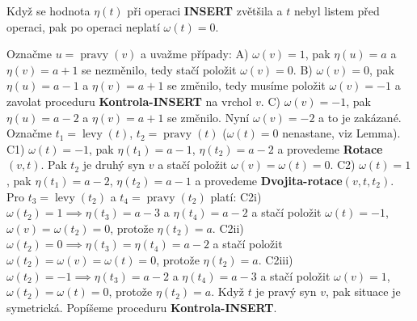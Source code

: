 \documentclass[a4paper,12pt]{article}
\DeclareMathOperator*{\levy}{levy}
\DeclareMathOperator*{\pravy}{pravy}
\begin{document}
Když se hodnota $\eta (t)$ při operaci {\bf INSERT }
zvětšila a $t$ nebyl listem před operaci, pak po operaci 
neplatí $\omega (t)=0$.
\endproclaim

Označme $u=\pravy(v)$ a uvažme případy:\newline 
A) $\omega (v)=1$, pak $\eta (u)=a$ a $\eta (v)=a+1$ se nezměnilo, 
tedy stačí položit $\omega (v)=0$.\newline 
B) $\omega (v)=0$, pak $\eta (u)=a-1$ a $\eta (v)=a+1$ se změnilo, 
tedy musíme položit $\omega (v)=-1$ a zavolat proceduru 
{\bf Kontrola-INSERT} na vrchol $v$.\newline 
C) $\omega (v)=-1$, pak $\eta (u)=a-2$ a $\eta (v)=a+1$ se změnilo. 
Nyní $\omega (v)=-2$ a to je zakázané. Označme $t_1=\levy
(t)$, 
$t_2=\pravy(t)$ ($\omega (t)=0$ nenastane, viz Lemma). 
\newline 
C1) $\omega (t)=-1$, pak $\eta (t_1)=a-1$, $\eta (t_2)=a-2$ a provedeme 
{\bf Rotace$(v,t)$}. Pak $t_2$ je druhý syn $v$ a stačí položit 
$\omega (v)=\omega (t)=0$.\newline 
C2) $\omega (t)=1$, pak $\eta (t_1)=a-2$, $\eta (t_2)=a-1$ a provedeme 
{\bf Dvojita-rotace$(v,t,t_2)$}. Pro $t_3=\levy(t_2)$ a $t_4=\pravy
(t_2)$ 
platí:\newline 
C2i) $\omega (t_2)=1\implies\eta (t_3)=a-3$ a $\eta (t_4)=a-2$ a stačí 
položit $\omega (t)=-1$, $\omega (v)=\omega (t_2)=0$, protože $
\eta (t_2)=a$.\newline 
C2ii) $\omega (t_2)=0\implies\eta (t_3)=\eta (t_4)=a-2$ a stačí položit 
$\omega (t_2)=\omega (v)=\omega (t)=0$, protože $\eta (t_2)=a$. \newline 
C2iii) $\omega (t_2)=-1\implies\eta (t_3)=a-2$ a $\eta (t_4)=a-3$ a 
stačí položit $\omega (v)=1$, $\omega (t_2)=\omega (t)=
0$, protože $\eta (t_2)=a$.\newline 
Když $t$ je pravý syn $v$, pak situace je symetrická.\newline 
Popíšeme proceduru {\bf Kontrola-INSERT}.
\end{document}

